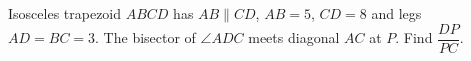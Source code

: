 Isosceles trapezoid $ABCD$ has $AB\parallel CD$, $AB=5$, $CD=8$ and legs $AD=BC=3$. The bisector of $\angle ADC$ meets diagonal $AC$ at $P$. Find $\dfrac{DP}{PC}$.
